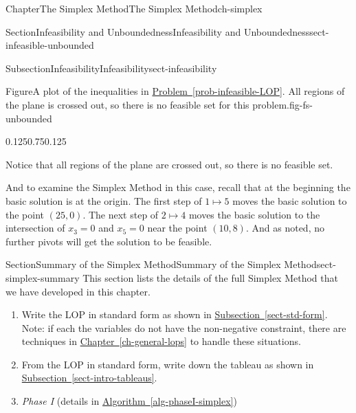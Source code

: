 \documentclass[oneside,10pt,]{book}
\newcommand{\xreffont}{\relax}
\numberwithin{equation}{section}
\begin{document}
\begin{chapterptx}{Chapter}{The Simplex Method}{}{The Simplex Method}{}{}{ch-simplex}
\begin{sectionptx}{Section}{Infeasibility and Unboundedness}{}{Infeasibility and Unboundedness}{}{}{sect-infeasible-unbounded}
\begin{subsectionptx}{Subsection}{Infeasibility}{}{Infeasibility}{}{}{sect-infeasibility}
\begin{figureptx}{Figure}{A plot of the inequalities in \hyperref[prob-infeasible-LOP]{Problem~{\xreffont\ref{prob-infeasible-LOP}}}. All regions of the plane is crossed out, so there is no feasible set for this problem.}{fig-fs-unbounded}{}
\begin{image}{0.125}{0.75}{0.125}{}
{%
}%
\end{image}%
\tcblower
\end{figureptx}%
Notice that all regions of the plane are crossed out, so there is no feasible set.%
\par
And to examine the Simplex Method in this case, recall that at the beginning the basic solution is at the origin.  The first step of \(1 \mapsto 5\) moves the basic solution to the point \((25,0)\). The next step of \(2 \mapsto 4\) moves the basic solution to the intersection of \(x_3=0\) and \(x_5=0\) near the point \((10,8)\).  And as noted, no further pivots will get the solution to be feasible.%
\end{subsectionptx}
\end{sectionptx}
%
%
\typeout{************************************************}
\typeout{************************************************}
%
\begin{sectionptx}{Section}{Summary of the Simplex Method}{}{Summary of the Simplex Method}{}{}{sect-simplex-summary}
This section lists the details of the full Simplex Method that we have developed in this chapter.%
\par
%
\begin{enumerate}
\item{}Write the LOP in standard form as shown in \hyperref[sect-std-form]{Subsection~{\xreffont\ref{sect-std-form}}}. Note: if each the variables do not have the non-negative constraint, there are techniques in \hyperref[ch-general-lops]{Chapter~{\xreffont\ref{ch-general-lops}}} to handle these situations.%
\item{}From the LOP in standard form, write down the tableau as shown in \hyperref[sect-intro-tableaus]{Subsection~{\xreffont\ref{sect-intro-tableaus}}}.%
\item{}\emph{Phase I} (details in \hyperref[alg-phaseI-simplex]{Algorithm~{\xreffont\ref{alg-phaseI-simplex}}})%

\end{enumerate}
\end{sectionptx}
\end{chapterptx}
\end{document}
